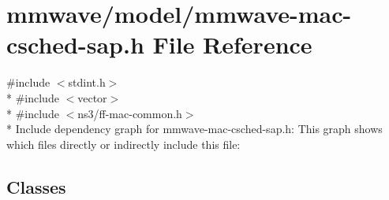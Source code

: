 \hypertarget{mmwave-mac-csched-sap_8h}{}\section{mmwave/model/mmwave-\/mac-\/csched-\/sap.h File Reference}
\label{mmwave-mac-csched-sap_8h}
{\ttfamily \#include $<$stdint.\+h$>$}\\*
{\ttfamily \#include $<$vector$>$}\\*
{\ttfamily \#include $<$ns3/ff-\/mac-\/common.\+h$>$}\\*
Include dependency graph for mmwave-\/mac-\/csched-\/sap.h\+:
This graph shows which files directly or indirectly include this file\+:
\subsection*{Classes}
